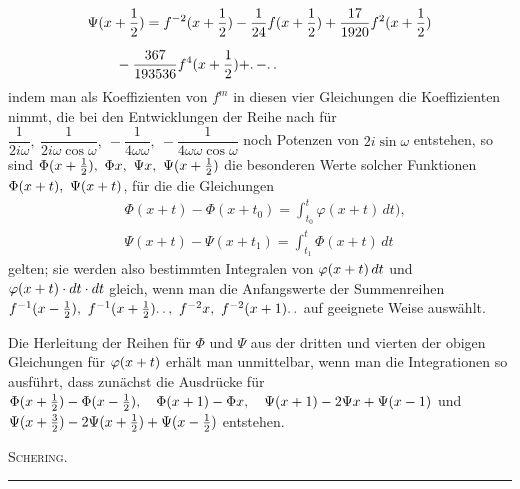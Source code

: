 \[
\begin{aligned}
&\Psi(x+\frac12)=f^{-2}(x+\frac12)-\frac{1}{24}f(x+\frac12)
+\frac{17}{1920}f^{2}(x+\frac12)\\[6pt]
&\qquad{}-\frac{367}{193536}f^{4}(x+\frac12)+\ldotp-\ldotp\ldotp
\end{aligned}
\]
indem man als Koeffizienten von $f^m$ in diesen vier Gleichungen die Koeffizienten nimmt, die bei den
Entwicklungen der Reihe nach für
$\dfrac{1}{2i\omega},\allowbreak{}\allowbreak \ \dfrac{1}{2i\omega\cos\omega},\allowbreak{}\allowbreak \ -\dfrac{1}{4\omega\omega},\allowbreak{}\allowbreak \ -\dfrac{1}{4\omega\omega\cos\omega}$
noch Potenzen von $2i\sin\omega$ entstehen,
so sind $\Phi(x+\nobreak{}\tfrac12),\allowbreak{}\ \Phi x,\allowbreak{}\ \Psi x,\allowbreak{}\ \Psi(x+\nobreak{}\tfrac12)$ die besonderen Werte solcher Funktionen
$\Phi(x+\nobreak{}t),\allowbreak{}\ \Psi(x+\nobreak{}t)$,
für die die Gleichungen
\[
\begin{aligned}
&\Phi(x+t)-\Phi(x+t_0)=\int_{t_0}^{t}\varphi(x+t)\,dt),\\[6pt]
&\Psi(x+t)-\Psi(x+t_1)=\int_{t_1}^{t}\Phi(x+t)\,dt
\end{aligned}
\]
gelten; sie werden also bestimmten Integralen von $\varphi(x+\nobreak{}t)\,\allowbreak{}dt$ und
$\varphi(x+\nobreak{}t)\cdot dt\cdot dt$ gleich, wenn
man die Anfangswerte der Summenreihen
\hfill\break{}
$f^{-1}(x-\nobreak{}\tfrac12),\allowbreak{}\ f^{-1}(x+\nobreak{}\tfrac12)\ldotp\ldotp,\allowbreak{}\ f^{-2}x,\allowbreak{}\ f^{-2}(x+\nobreak{}1)\ldotp\ldotp$
auf geeignete Weise auswählt.

Die Herleitung der Reihen für $\Phi$ und $\Psi$ aus der dritten und vierten der obigen Gleichungen für
$\varphi(x+\nobreak{}t)$ erhält man unmittelbar, wenn man die Integrationen so ausführt, dass zunächst die Ausdrücke für
\hfill\break{}
$\Phi(x+\nobreak{}\tfrac12)-\Phi(x-\nobreak{}\tfrac12),\allowbreak{}\quad \Phi(x+\nobreak{}1)-\Phi x,\allowbreak{}\quad
\Psi(x+\nobreak{}1)-2\Psi x+\Psi(x-\nobreak{}1)$ und
$\Psi(x+\nobreak{}\tfrac32)-2\Psi(x+\nobreak{}\tfrac12)+\Psi(x-\nobreak{}\tfrac12)$
entstehen.
\begin{flushright}\textsc{Schering.}\end{flushright}
\begin{center}\rule{9em}{0.3pt}\end{center}
\clearpage
\endgroup
